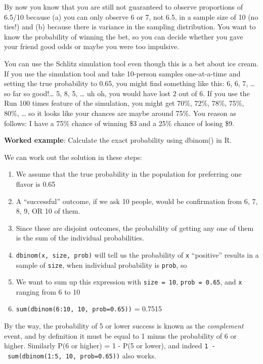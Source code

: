 \documentclass[
  openany]{book}
\providecommand{\tightlist}{%
  \setlength{\itemsep}{0pt}\setlength{\parskip}{0pt}}
\begin{document}
By now you know that you are still not guaranteed to observe proportions of 6.5/10 because (a) you can only observe 6 or 7, not 6.5, in a sample size of 10 (no ties!) and (b) because there is variance in the sampling distribution. You want to know the probability of winning the bet, so you can decide whether you gave your friend good odds or maybe you were too impulsive.

You can use the Schlitz simulation tool even though this is a bet about ice cream. If you use the simulation tool and take 10-person samples one-at-a-time and setting the true probability to 0.65, you might find something like this: 6, 6, 7, \ldots{} so far so good!\ldots{} 5, 8, 5, \ldots{} uh oh, you would have lost 2 out of 6. If you use the Run 100 times feature of the simulation, you might get 70\%, 72\%, 78\%, 75\%, 80\%, \ldots{} so it looks like your chances are maybe around 75\%. You reason as follows: I have a 75\% chance of winning \$3 and a 25\% chance of losing \$9.

\textbf{Worked example}: Calculate the exact probability using dbinom() in R.

We can work out the solution in these steps:

\begin{enumerate}
\def\labelenumi{\arabic{enumi}.}
\tightlist
\item
  We assume that the true probability in the population for preferring one flavor is 0.65
\item
  A ``successful'' outcome, if we ask 10 people, would be confirmation from 6, 7, 8, 9, OR 10 of them.
\item
  Since these are disjoint outcomes, the probability of getting any one of them is the sum of the individual probabilities.
\item
  \texttt{dbinom(x,\ size,\ prob)} will tell us the probability of \texttt{x} ``positive'' results in a sample of \texttt{size}, when individual probability is \texttt{prob}, so
\item
  We want to sum up this expression with \texttt{size\ =\ 10}, \texttt{prob\ =\ 0.65}, and \texttt{x} ranging from 6 to 10
\item
  \texttt{sum(dbinom(6:10,\ 10,\ prob=0.65))} = 0.7515
\end{enumerate}

By the way, the probability of 5 or lower success is known as the \emph{complement} event, and by definition it must be equal to 1 minus the probability of 6 or higher. Similarly P(6 or higher) = 1 - P(5 or lower), and indeed \texttt{1\ -\ sum(dbinom(1:5,\ 10,\ prob=0.65))} also works.
\end{document}
